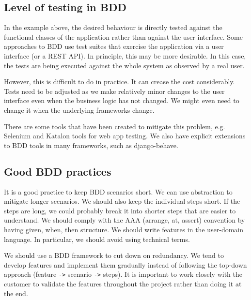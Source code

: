 \documentclass[a4paper, openany]{memoir}
\begin{document}
\subsection{Level of testing in BDD}
In the example above, the desired behaviour is directly tested against the functional classes of the application rather than against the user interface. Some approaches to BDD use test suites that exercise the application via a user interface (or a REST API). In principle, this may be more desirable. In this case, the tests are being executed against the whole system as observed by a real user. 

However, this is difficult to do in practice. It can crease the cost considerably. Tests need to be adjusted as we make relatively minor changes to the user interface even when the business logic has not changed. We might even need to change it when the underlying frameworks change.

There are some tools that have been created to mitigate this problem, e.g. Selenium and Katalon tools for web app testing. We also have explicit extensions to BDD tools in many frameworks, such as django-behave.

\subsection{Good BDD practices}
It is a good practice to keep BDD scenarios short. We can use abstraction to mitigate longer scenarios. We should also keep the individual steps short. If the steps are long, we could probably break it into shorter steps that are easier to understand. We should comply with the AAA (arrange, at, assert) convention by having given, when, then structure. We should write features in the user-domain language. In particular, we should avoid using technical terms.

We should use a BDD framework to cut down on redundancy. We tend to develop features and implement them gradually instead of following the top-down approach (feature \texttt{->} scenario \texttt{->} steps). It is important to work closely with the customer to validate the features throughout the project rather than doing it at the end.
\end{document}
